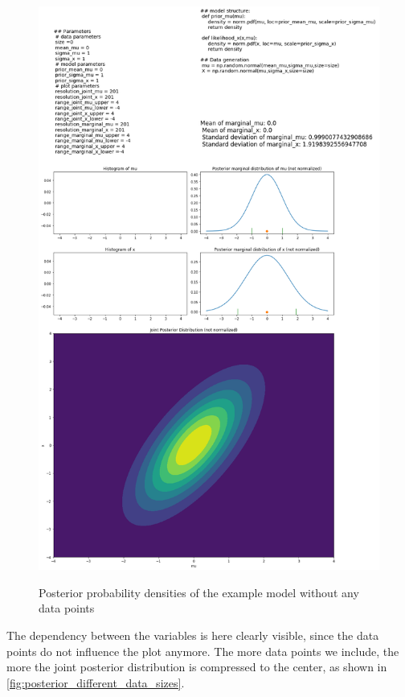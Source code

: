 \documentclass{article}
\begin{document}
\begin{figure}
	\includegraphics[width=\textwidth]{images/ground_truth_posterior_5.png}
	\label{fig:ground_truth_posterior_5}
	\caption[Posterior probability densities of the example model without any data points]{Posterior probability densities of the example model without any data points}
\end{figure}
The dependency between the variables is here clearly visible, since the data points do not influence the plot anymore. The more data points we include, the more the joint posterior distribution is compressed to the center, as shown in \ref{fig:posterior_different_data_sizes}.
\end{document}
